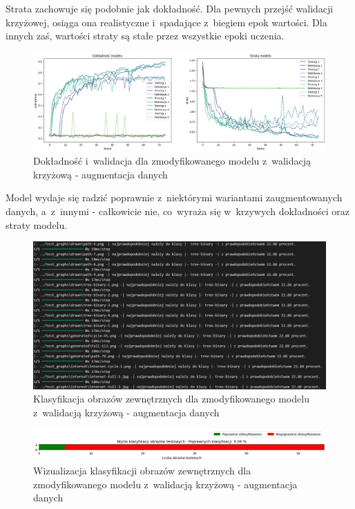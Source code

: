 Strata zachowuje się podobnie jak dokładność. Dla pewnych przejść walidacji krzyżowej, osiąga ona realistyczne
i~spadające z~biegiem epok wartości. Dla innych zaś, wartości straty są stałe przez wszystkie epoki uczenia.

\begin{figure}[ht]
	\centering
	\includegraphics[width=15.5cm]{resources/tests/images/v4/crossvalid_3_img.png}
	\caption{Dokładność i~walidacja dla zmodyfikowanego modelu z~walidacją krzyżową - augmentacja danych}
	\label{Fig:tests-cv-3a}
\end{figure}
\FloatBarrier

Model wydaje się radzić poprawnie z~niektórymi wariantami zaugmentowanych danych, a~z~innymi - całkowicie nie,
co~wyraża się w~krzywych dokładności oraz straty modelu.

\begin{figure}[ht]
	\centering
	\includegraphics[width=15.5cm]{resources/tests/images/v4/crossvalid_3_txt.png}
	\caption{Klasyfikacja obrazów zewnętrznych dla zmodyfikowanego modelu z~walidacją krzyżową - augmentacja danych}
	\label{Fig:tests-cv-3b}
\end{figure}
\FloatBarrier

\begin{figure}[ht]
	\centering
	\includegraphics[width=15.5cm]{resources/tests/images/v4/crossvalid_3_bar.png}
	\caption{Wizualizacja klasyfikacji obrazów zewnętrznych dla zmodyfikowanego modelu z~walidacją krzyżową - augmentacja danych}
	\label{Fig:tests-cv-3c}
\end{figure}
\FloatBarrier

